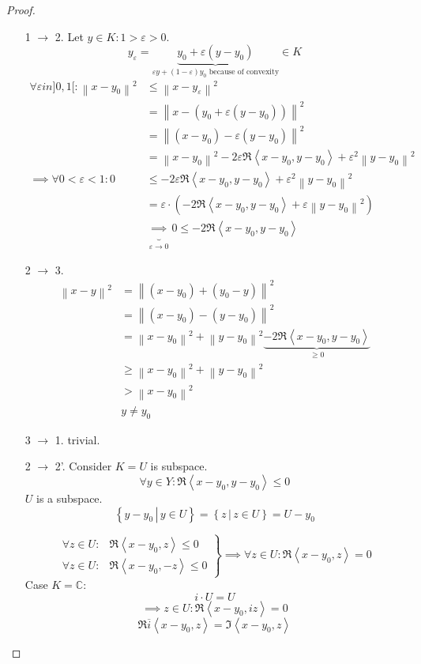 \documentclass{article}
\numberwithin{lecref}{section}
\newcommand{\setdef}[2]{\left\{\left.#1\,\right|\,#2\right\}}
\newcommand{\ip}[2]{\left\langle#1,#2\right\rangle} %
\newcommand{\norm}[1]{\left\|#1\right\|}
\begin{document}
\begin{proof}
  \begin{enumerate}
    \item[1 $\to$ 2.]
      Let $y \in K: 1 > \varepsilon > 0$.
      \[ y_\varepsilon = \underbrace{y_0 + \varepsilon(y - y_0)}_{\varepsilon y + (1 - \varepsilon) y_0 \text{ because of convexity}} \in K \]
      \begin{align*}
        \forall \varepsilon in ]0,1[: \norm{x - y_0}^2
          &\leq \norm{x - y_{\varepsilon}}^2 \\
          &= \norm{x - (y_0 + \varepsilon (y - y_0))}^2 \\
          &= \norm{(x - y_0) - \varepsilon(y - y_0)}^2 \\
          &= \norm{x - y_0}^2 - 2\varepsilon\Re\ip{x - y_0}{y - y_0} + \varepsilon^2 \norm{y - y_0}^2 \\
       \implies \forall 0 < \varepsilon < 1: 0
          &\leq -2\varepsilon \Re\ip{x - y_0}{y - y_0} + \varepsilon^2 \norm{y - y_0}^2 \\
          &= \varepsilon \cdot \left(- 2\Re\ip{x - y_0}{y - y_0} + \varepsilon \norm{y - y_0}^2\right) \\
          &\underbrace{\implies}_{\varepsilon \to 0} 0 \leq - 2\Re\ip{x - y_0}{y - y_0}
      \end{align*}
    \item[2 $\to$ 3.]
      \begin{align*}
        \norm{x - y}^2 &= \norm{(x - y_0) + (y_0 - y)}^2 \\
          &= \norm{(x - y_0) - (y - y_0)}^2 \\
          &= \norm{x - y_0}^2 + \norm{y - y_0}^2 \underbrace{- 2\Re\ip{x - y_0}{y - y_0}}_{\geq 0} \\
          &\geq \norm{x - y_0}^2 + \norm{y - y_0}^2 \\
          &> \norm{x - y_0}^2 \\
          & y \neq y_0
      \end{align*}
    \item[3 $\to$ 1.]
      trivial.
    \item[2 $\to$ 2'.]
      Consider $K = U$ is subspace.
      \[ \forall y \in Y: \Re\ip{x - y_0}{y - y_0} \leq 0 \]
      $U$ is a subspace.
      \[ \setdef{y - y_0}{y \in U} = \setdef{z}{z \in U} = U - y_0 \]

      \[
        \left.
        \begin{array}{ll}
          \forall z \in U: &\Re\ip{x - y_0}{z} \leq 0 \\
          \forall z \in U: &\Re\ip{x - y_0}{-z} \leq 0
        \end{array}
        \right\}
        \implies \forall z \in U: \Re\ip{x - y_0}{z} = 0
      \]
      Case $K = \mathbb C$:
      \[ i \cdot U = U \]
      \[ \implies z \in U: \Re\ip{x - y_0}{iz} = 0 \]
      \[ \Re\overline{i}\ip{x - y_0}{z} = \Im\ip{x - y_0}{z} \]
  \end{enumerate}
\end{proof}
\end{document}
